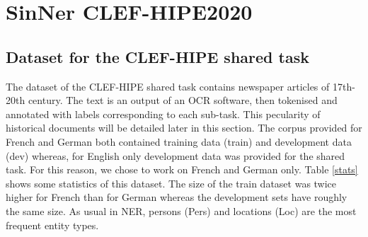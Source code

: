 \chapter{SinNer CLEF-HIPE2020}

\section{Dataset for the CLEF-HIPE shared task}
\label{sec:dataset}

The dataset of the CLEF-HIPE shared task contains newspaper articles of 17th-20th century. The text is an output of an OCR software, then tokenised and annotated with labels corresponding to each sub-task. This pecularity of historical documents will be detailed later in this section.
The corpus provided for French and German both contained training data (train) and development data (dev) whereas, for English only development data was provided for the shared task. For this reason, we chose to work on French and German only.
Table \ref{stats} shows some statistics of this dataset. The size of the train dataset was twice higher for French than for German whereas the development sets have roughly the same size. As usual in NER, persons (Pers) and locations (Loc) are the most frequent entity types.

